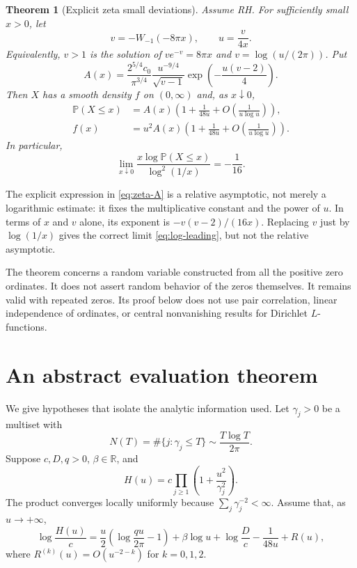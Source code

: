 \documentclass[11pt]{article}
\newtheorem{theorem}{Theorem}[section]
\theoremstyle{remark}\newtheorem{remark}[theorem]{Remark}
\newcommand{\Prob}{\mathbb P}
\newcommand{\R}{\mathbb R}
\newcommand{\asymerror}{O\!\left(\frac1{u\log u}\right)}
\begin{document}
\begin{theorem}[Explicit zeta small deviations]\label{thm:zeta}
Assume RH. For sufficiently small $x>0$, let
\begin{equation}\label{eq:zeta-saddle}
 v=-W_{-1}(-8\pi x),\qquad u=\frac{v}{4x}.
\end{equation}
Equivalently, $v>1$ is the solution of $ve^{-v}=8\pi x$ and
$v=\log(u/(2\pi))$. Put
\begin{equation}\label{eq:zeta-A}
 A(x)=\frac{2^{5/4}c_0}{\pi^{3/4}}
       \frac{u^{-9/4}}{\sqrt{v-1}}
       \exp\!\left(-\frac{u(v-2)}4\right).
\end{equation}
Then $X$ has a smooth density $f$ on $(0,\infty)$ and, as $x\downarrow0$,
\begin{align}
 \Prob(X\leq x)&=A(x)
       \left(1+\frac1{48u}+\asymerror\right),\label{eq:zeta-cdf}\\
 f(x)&=u^2A(x)
       \left(1+\frac1{48u}+\asymerror\right).\label{eq:zeta-density}
\end{align}
In particular,
\begin{equation}\label{eq:log-leading}
 \lim_{x\downarrow0}
 \frac{x\log\Prob(X\leq x)}{\log^2(1/x)}=-\frac1{16}.
\end{equation}
\end{theorem}

The explicit expression in \eqref{eq:zeta-A} is a relative asymptotic, not
merely a logarithmic estimate: it fixes the multiplicative constant and the
power of $u$. In terms of $x$ and $v$ alone, its exponent is
$-v(v-2)/(16x)$. Replacing $v$ just by $\log(1/x)$ gives the correct limit
\eqref{eq:log-leading}, but not the relative asymptotic.

The theorem concerns a random variable constructed from all the positive
zero ordinates. It does not assert random behavior of the zeros themselves.
It remains valid with repeated zeros. Its proof below does not use pair
correlation, linear independence of ordinates, or central nonvanishing
results for Dirichlet $L$-functions.

\section{An abstract evaluation theorem}

We give hypotheses that isolate the analytic information used. Let
$\gamma_j>0$ be a multiset with
\begin{equation}\label{eq:count}
 N(T)=\#\{j:\gamma_j\leq T\}
       \sim\frac{T\log T}{2\pi}.
\end{equation}
Suppose $c,D,q>0$, $\beta\in\R$, and
\begin{equation}\label{eq:product}
 H(u)=c\prod_{j\geq1}\left(1+\frac{u^2}{\gamma_j^2}\right).
\end{equation}
The product converges locally uniformly because
$\sum_j\gamma_j^{-2}<\infty$. Assume that, as $u\to+\infty$,
\begin{equation}\label{eq:h-asymptotic}
 \log\frac{H(u)}c
 =\frac u2\left(\log\frac{qu}{2\pi}-1\right)
  +\beta\log u+\log\frac Dc-\frac1{48u}+R(u),
\end{equation}
where $R^{(k)}(u)=O(u^{-2-k})$ for $k=0,1,2$.
\end{document}
